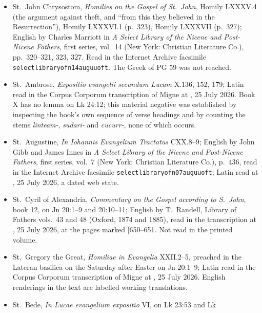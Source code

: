 {\fontsize{8.6}{9.6}\selectfont
\begin{itemize}[itemsep=0pt,parsep=0pt,topsep=0.05em]
\item St.\ John Chrysostom, \emph{Homilies on the Gospel of St.\ John}, Homily
LXXXV.4 (the argument against theft, and ``from this they believed in the
Resurrection''), Homily LXXXVI.1 (p.~323), Homily LXXXVII (p.~327); English by
Charles Marriott in \emph{A Select Library of the Nicene and Post-Nicene
Fathers}, first series, vol.~14 (New York: Christian Literature Co.),
pp.~320--321, 323, 327. Read in the Internet Archive facsimile
\texttt{selectlibraryofn14auguuoft}. The Greek of PG 59 was not reached.
\item St.\ Ambrose, \emph{Expositio evangelii secundum Lucam} X.136, 152, 179;
Latin read in the Corpus Corporum transcription of Migne at
,
25 July 2026. Book X has no lemma on Lk 24:12; this material negative was
established by inspecting the book's own sequence of verse headings and by
counting the stems \emph{linteam-}, \emph{sudari-} and \emph{cucurr-}, none of
which occurs.
\item St.\ Augustine, \emph{In Iohannis Evangelium Tractatus} CXX.8--9; English
by John Gibb and James Innes in \emph{A Select Library of the Nicene and
Post-Nicene Fathers}, first series, vol.~7 (New York: Christian Literature Co.),
p.~436, read in the Internet Archive facsimile \texttt{selectlibraryofn07auguuoft};
Latin read at
,
25 July 2026, a dated web state.
\item St.\ Cyril of Alexandria, \emph{Commentary on the Gospel according to S.\
John}, book 12, on Jn 20:1--9 and 20:10--11; English by T.~Randell, Library of
Fathers vols.\ 43 and 48 (Oxford, 1874 and 1885), read in the transcription at
,
25 July 2026, at the pages marked $|$650--651. Not read in the printed volume.
\item St.\ Gregory the Great, \emph{Homiliae in Evangelia} XXII.2--5, preached
in the Lateran basilica on the Saturday after Easter on Jn 20:1--9; Latin read in
the Corpus Corporum transcription of Migne at
,
25 July 2026. English renderings in the text are labelled working translations.
\item St.\ Bede, \emph{In Lucae evangelium expositio} VI, on Lk 23:53 and Lk

\end{itemize}}
